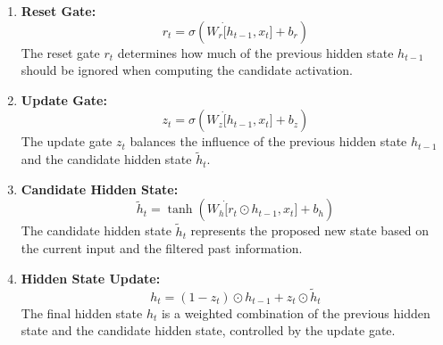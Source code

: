 \documentclass{dsfe}
\begin{document}
\begin{enumerate}
\item \textbf{Reset Gate:}
\begin{equation}
r_t=\sigma\left(W_r \dot [h_{t-1}, x_t]+b_r \right)
\end{equation}
The reset gate $r_t$ determines how much of the previous hidden state $h_{t-1}$ should be ignored when computing the candidate activation.
\item \textbf{Update Gate:} 
\begin{equation}
z_t=\sigma\left(W_z \dot [h_{t-1}, x_t]+b_z \right)
\end{equation}
The update gate $z_t$ balances the influence of the previous hidden state $h_{t-1}$ and the candidate hidden state $\tilde{h}_t$.
\item \textbf{Candidate Hidden State:}
\begin{equation}
\tilde{h}_t=\tanh\left(W_h \dot [r_{t}\odot h_{t-1} , x_t]+b_h \right)
\end{equation}
The candidate hidden state $\tilde{h}_t$ represents the proposed new state based on the current input and the filtered past information.
\item \textbf{Hidden State Update:}
\begin{equation}
h_t=\left(1-z_t\right)\odot h_{t-1} + z_t \odot \tilde{h}_t
\end{equation}
The final hidden state $h_t$ is a weighted combination of the previous hidden state and the candidate hidden state, controlled by the update gate.
\end{enumerate}
\end{document}
